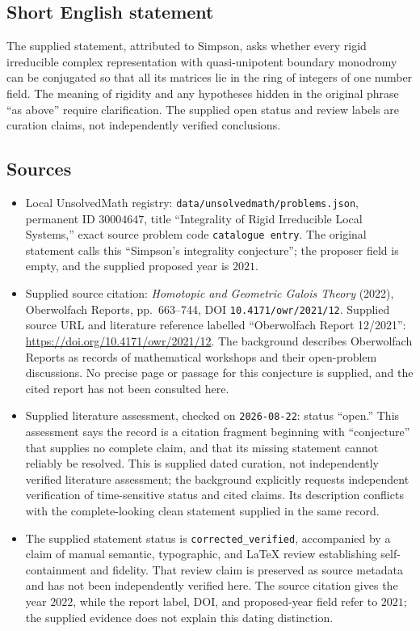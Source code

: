 \documentclass[11pt]{article}
\begin{document}
\subsection{Short English statement}
The supplied statement, attributed to Simpson, asks whether every rigid irreducible complex representation with quasi-unipotent boundary monodromy can be conjugated so that all its matrices lie in the ring of integers of one number field. The meaning of rigidity and any hypotheses hidden in the original phrase ``as above'' require clarification. The supplied open status and review labels are curation claims, not independently verified conclusions.
\subsection{Sources}
\begin{itemize}
\item Local UnsolvedMath registry: \texttt{data/unsolvedmath/problems.json}, permanent ID \(30004647\), title ``Integrality of Rigid Irreducible Local Systems,'' exact source problem code \texttt{catalogue entry}. The original statement calls this ``Simpson's integrality conjecture''; the proposer field is empty, and the supplied proposed year is \(2021\).
\item Supplied source citation: \emph{Homotopic and Geometric Galois Theory} (2022), Oberwolfach Reports, pp.\ 663--744, DOI \texttt{10.4171/owr/2021/12}. Supplied source URL and literature reference labelled ``Oberwolfach Report 12/2021'': \url{https://doi.org/10.4171/owr/2021/12}. The background describes Oberwolfach Reports as records of mathematical workshops and their open-problem discussions. No precise page or passage for this conjecture is supplied, and the cited report has not been consulted here.
\item Supplied literature assessment, checked on \texttt{2026-08-22}: status ``open.'' This assessment says the record is a citation fragment beginning with ``conjecture'' that supplies no complete claim, and that its missing statement cannot reliably be resolved. This is supplied dated curation, not independently verified literature assessment; the background explicitly requests independent verification of time-sensitive status and cited claims. Its description conflicts with the complete-looking clean statement supplied in the same record.
\item The supplied statement status is \texttt{corrected\_verified}, accompanied by a claim of manual semantic, typographic, and LaTeX review establishing self-containment and fidelity. That review claim is preserved as source metadata and has not been independently verified here. The source citation gives the year \(2022\), while the report label, DOI, and proposed-year field refer to \(2021\); the supplied evidence does not explain this dating distinction.
\end{itemize}
\end{document}
